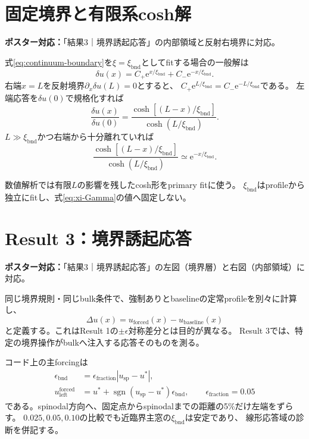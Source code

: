 \documentclass[a4paper,12pt]{ltjsarticle}
\newcommand{\PosterMap}[1]{%
  \begin{tcolorbox}[enhanced,boxrule=0pt,arc=1mm,colback=softgray,
    left=2mm,right=2mm,top=1mm,bottom=1mm,before skip=0pt,after skip=0.7em]
  \normalsize\textbf{ポスター対応：}#1
  \end{tcolorbox}}
\newcommand{\e}{\mathrm e}
\newcommand{\sgn}{\operatorname{sgn}}
\newcommand{\bnd}{\mathrm{bnd}}
\begin{document}
\section{固定境界と有限系cosh解}\label{sec:cosh}
\PosterMap{「結果3｜境界誘起応答」の内部領域と反射右境界に対応。}

式\eqref{eq:continuum-boundary}を$\xi=\xi_{\bnd}$としてfitする場合の一般解は
\begin{equation}
 \delta u(x)=C_+\e^{x/\xi_{\bnd}}+C_-\e^{-x/\xi_{\bnd}}.
\end{equation}
右端$x=L$を反射境界$\partial_x\delta u(L)=0$とすると、
$C_+\e^{L/\xi_{\bnd}}=C_-\e^{-L/\xi_{\bnd}}$である。
左端応答を$\delta u(0)$で規格化すれば
\begin{equation}
 \boxed{
 \frac{\delta u(x)}{\delta u(0)}
 =\frac{\cosh[(L-x)/\xi_{\bnd}]}{\cosh(L/\xi_{\bnd})}
 }.
 \label{eq:finite-L-cosh}
\end{equation}
$L\gg\xi_{\bnd}$かつ右端から十分離れていれば
\begin{equation}
 \frac{\cosh[(L-x)/\xi_{\bnd}]}{\cosh(L/\xi_{\bnd})}
 \simeq\e^{-x/\xi_{\bnd}}.
 \label{eq:cosh-to-exp}
\end{equation}

数値解析では有限$L$の影響を残したcosh形をprimary fitに使う。
$\xi_{\bnd}$はprofileから独立にfitし、式\eqref{eq:xi-Gamma}の値へ固定しない。

\section{Result 3：境界誘起応答}\label{sec:result3}
\PosterMap{「結果3｜境界誘起応答」の左図（境界層）と右図（内部領域）に対応。}

同じ境界規則・同じbulk条件で、強制ありとbaselineの定常profileを別々に計算し、
\begin{equation}
 \boxed{\Delta u(x)=u_{\mathrm{forced}}(x)-u_{\mathrm{baseline}}(x)}
 \label{eq:boundary-response}
\end{equation}
と定義する。これはResult 1の$\pm\epsilon$対称差分とは目的が異なる。
Result 3では、特定の境界操作がbulkへ注入する応答そのものを測る。

コード上の主forcingは
\begin{align}
 \epsilon_{\bnd}
 &=\epsilon_{\mathrm{fraction}}|u_{\mathrm{sp}}-u^*|,\\
 u_{\mathrm{left}}^{\mathrm{forced}}
 &=u^*+\sgn(u_{\mathrm{sp}}-u^*)\epsilon_{\bnd},
 \qquad \boxed{\epsilon_{\mathrm{fraction}}=0.05}
 \label{eq:boundary-forcing}
\end{align}
である。spinodal方向へ、固定点からspinodalまでの距離の5\%だけ左端をずらす。
$0.025,0.05,0.10$の比較でも近臨界主窓の$\xi_{\bnd}$は安定であり、
線形応答域の診断を併記する。
\end{document}
